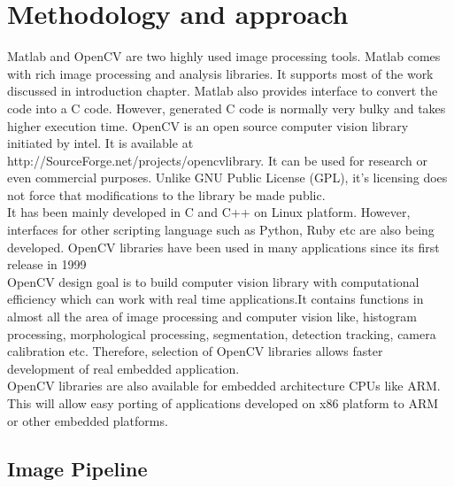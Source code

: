 
\chapter{Methodology and approach} %
\label{Chapter2}

Matlab and OpenCV are two highly used image processing tools. Matlab
comes with rich image processing and analysis libraries. It supports
most of the work discussed in introduction chapter. Matlab also provides
interface to convert the code into a C code. However, generated C code
is normally very bulky and takes higher execution time. OpenCV is an
open source computer vision library initiated by intel. It is available
at http://SourceForge.net/projects/opencvlibrary. It can be used for
research or even commercial purposes. Unlike GNU Public License (GPL),
it's licensing does not force that modifications to the library be made
public. \\

It has been mainly developed in C and C++ on Linux platform. However,
interfaces for other scripting language such as Python, Ruby etc are
also being developed. OpenCV libraries have been used in many
applications since its first release in 1999\\

OpenCV design goal is to build computer vision library with
computational efficiency which can work with real time applications.It
contains functions in almost all the area of image processing  and
computer vision like, histogram processing, morphological processing,
segmentation, detection tracking, camera calibration etc. Therefore,
selection of OpenCV libraries allows faster development of real embedded
application.\\

OpenCV libraries are also available for embedded architecture CPUs like
ARM. This will allow easy porting of applications developed on x86
platform to ARM or other embedded platforms.\\

\pagebreak

\section{Image Pipeline}

